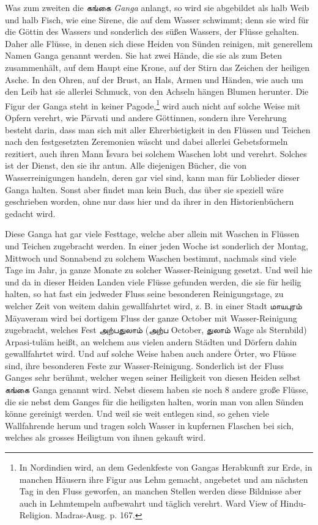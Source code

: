 \documentclass{article}
\newcommand{\TamilText}[1]{\texttamil{#1}}
\newcommand{\tam}[1]{\TamilText{#1}}
\begin{document}
Was zum zweiten die \tam{கங்கை} \emph{Ganga} anlangt, so wird sie abgebildet als halb Weib und halb Fisch, wie eine Sirene, die auf dem Wasser schwimmt; denn sie wird für die Göttin des Wassers und sonderlich des süßen Wassers, der Flüsse gehalten. Daher alle Flüsse, in denen sich diese Heiden von Sünden reinigen, mit generellem Namen Ganga genannt werden. Sie hat zwei Hände, die sie als zum Beten zusammenhält, auf dem Haupt eine Krone, auf der Stirn das Zeichen der heiligen Asche. In den Ohren, auf der Brust, an Hals, Armen und Händen, wie auch um den Leib hat sie allerlei Schmuck, von den Achseln hängen Blumen herunter. Die Figur der Ganga steht in keiner Pagode,\footnote{In Nordindien wird, an dem Gedenkfeste von Gangas Herabkunft zur Erde, in manchen Häusern ihre Figur aus Lehm gemacht, angebetet und am nächsten Tag in den Fluss geworfen, an manchen Stellen werden diese Bildnisse aber auch in Lehmtempeln aufbewahrt und täglich verehrt. Ward View of Hindu-Religion. Madras-Ausg. p. 167.} wird auch nicht auf solche Weise mit Opfern verehrt, wie P\={a}rvati und andere Göttinnen, sondern ihre Verehrung besteht darin, dass man sich mit aller Ehrerbietigkeit in den Flüssen und Teichen nach den festgesetzten Zeremonien wäscht und dabei allerlei Gebetsformeln rezitiert, auch ihren Mann \={I}svara bei solchem Waschen lobt und verehrt. Solches ist der Dienst, den sie ihr antun. Alle diejenigen Bücher, die von Wasserreinigungen handeln, deren gar viel sind, kann man für Loblieder dieser Ganga halten. Sonst aber findet man kein Buch, das über sie speziell wäre geschrieben worden, ohne nur dass hier und da ihrer in den Historienbüchern gedacht wird.

Diese Ganga hat gar viele Festtage, welche aber allein mit Waschen in Flüssen und Teichen zugebracht werden. In einer jeden Woche ist sonderlich der Montag, Mittwoch und Sonnabend zu solchem Waschen bestimmt, nachmals sind viele Tage im Jahr, ja ganze Monate zu solcher Wasser-Reinigung gesetzt. Und weil hie und da in dieser Heiden Landen viele Flüsse gefunden werden, die sie für heilig halten, so hat fast ein jedweder Fluss seine besonderen Reinigungstage, zu welcher Zeit von weitem dahin gewallfahrtet wird, z. B. in einer Stadt \tam{மாயபுரம்} M\={a}yaveram wird bei dortigem Fluss der ganze October mit Wasser-Reinigung zugebracht, welches Fest \tam{அற்பதுலாம்} (\tam{அற்ப} October, \tam{துலாம்} Wage als Sternbild) Arpasi-tul\={a}m heißt, an welchem aus vielen andern Städten und Dörfern dahin gewallfahrtet wird. Und auf solche Weise haben auch andere Örter, wo Flüsse sind, ihre besonderen Feste zur Wasser-Reinigung. Sonderlich ist der Fluss Ganges sehr berühmt, welcher wegen seiner Heiligkeit von diesen Heiden selbst \tam{கங்கை} Ganga genannt wird. Nebst diesem haben sie noch 8 andere große Flüsse, die sie nebst dem Ganges für die heiligsten halten, worin man von allen Sünden könne gereinigt werden. Und weil sie weit entlegen sind, so gehen viele Wallfahrende herum und tragen solch Wasser in kupfernen Flaschen bei sich, welches als grosses Heiligtum von ihnen gekauft wird.
\end{document}
